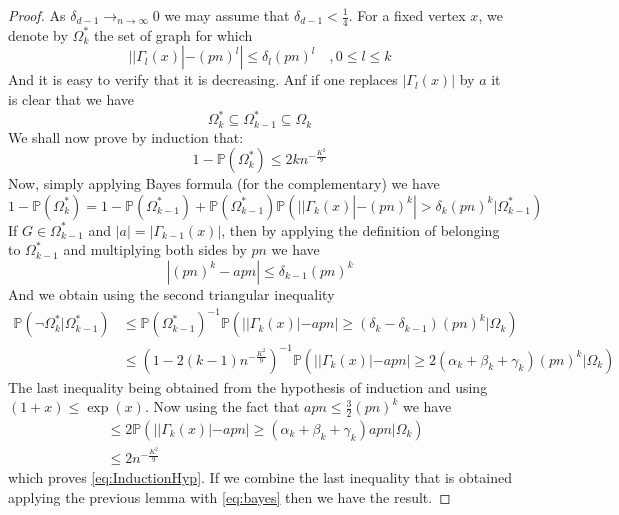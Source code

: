 \begin{proof}
	As $\delta_{d-1} \longrightarrow_{n\to\infty} 0$ we may assume that $\delta_{d-1} < \frac{1}{4}$.
	For a fixed vertex $x$, we denote by $\Omega_k^*$ the set of graph for which 
	\begin{equation}
		||\Gamma_l(x)| - (pn)^l| \leq \delta_l(pn)^l \quad , 0 \leq l \leq k
	\end{equation}
	And it is easy to verify that it is decreasing. Anf if one replaces $|\Gamma_l(x)|$ by $a$ it is clear that we have
	\begin{equation}
		\Omega_k^* \subseteq \Omega_{k-1}^* \subseteq \Omega_k
	\end{equation}
	We shall now prove by induction that:
	\begin{equation}\label{eq:InductionHyp}
		1 - \mathbb{P}(\Omega_k^*)\leq 2kn^{-\frac{K^2}{9}}
	\end{equation}
	Now, simply applying Bayes formula (for the complementary) we have
	\begin{equation}\label{eq:bayes}
		1 - \mathbb{P}(\Omega_k^*)= 1-\mathbb{P}(\Omega_{k-1}^*)
		+ \mathbb{P}(\Omega_{k-1}^*)\mathbb{P}(||\Gamma_k(x)| - (pn)^k| > \delta_k(pn)^k | \Omega_{k-1}^*)
	\end{equation}
	If $G \in \Omega_{k-1}^*$ and $|a| = |\Gamma_{k-1}(x)|$, then by applying the definition of belonging to $\Omega_{k-1}^*$ and multiplying both sides by $pn$ we have 
	\begin{equation}
		|(pn)^k - apn| \leq \delta_{k-1}(pn)^k
	\end{equation}
	And we obtain using the second triangular inequality
	\begin{align}
		\mathbb{P}(\neg\Omega_k^* | \Omega_{k-1}^*) 
		&\leq \mathbb{P}(\Omega_{k-1}^*)^{-1}\mathbb{P}(||\Gamma_k(x)| - apn| \geq (\delta_k - \delta_{k-1})(pn)^k | \Omega_k)\\
		&\leq (1 - 2(k-1)n^{-\frac{K^2}{9}})^{-1}\mathbb{P}(||\Gamma_k(x)| - apn| \geq 2(\alpha_k + \beta_k + \gamma_k)(pn)^k | \Omega_k)
	\end{align}
	The last inequality being obtained from the hypothesis of induction and using $(1+x) \leq \exp(x)$. Now using the fact that $apn \leq \frac{3}{2} (pn)^k$ we have
	\begin{align}
		&\leq 2\mathbb{P}(||\Gamma_k(x)| - apn| \geq (\alpha_k + \beta_k + \gamma_k)apn | \Omega_k)\\
		&\leq 2n^{-\frac{K^2}{9}}
	\end{align}
	which proves \eqref{eq:InductionHyp}.
	If we combine the last inequality that is obtained applying the previous lemma with \eqref{eq:bayes} then we have the result.
\end{proof}
